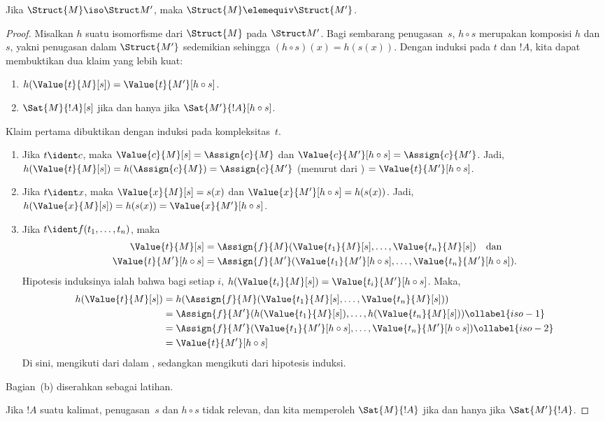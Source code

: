 \documentclass[../../../include/open-logic-section]{subfiles}
\begin{document}
\begin{thm}
Jika $\Struct{M} \iso \Struct M'$, maka $\Struct{M} \elemequiv
\Struct{M'}$.
\end{thm}

\begin{proof}
Misalkan $h$ suatu isomorfisme dari $\Struct{M}$ pada $\Struct M'$. Bagi
sembarang penugasan~$s$, $h \circ s$ merupakan komposisi $h$ dan $s$, yakni
penugasan dalam $\Struct{M'}$ sedemikian sehingga $(h \circ s)(x) = h(s(x))$.
Dengan induksi pada $t$ dan $!A$, kita dapat membuktikan dua klaim yang lebih
kuat:
\begin{enumerate}
  \item[a.] $h(\Value{t}{M}[s]) = \Value{t}{M'}[h\circ s]$.
  \item[b.] $\Sat{M}{!A}[s]$ jika dan hanya jika
    $\Sat{M'}{!A}[h \circ s]$.
\end{enumerate}
Klaim pertama dibuktikan dengan induksi pada kompleksitas~$t$.
\begin{enumerate}
\item Jika $t \ident c$, maka $\Value{c}{M}[s] = \Assign{c}{M}$ dan
  $\Value{c}{M'}[h \circ s] = \Assign{c}{M'}$. Jadi,
  $h(\Value{t}{M}[s]) = h(\Assign{c}{M}) = \Assign{c}{M'}$ (menurut
   dari ) $=
  \Value{t}{M'}[h \circ s]$.
\item Jika $t \ident x$, maka $\Value{x}{M}[s] = s(x)$ dan
  $\Value{x}{M'}[h \circ s] = h(s(x))$. Jadi,
  $h(\Value{x}{M}[s]) = h(s(x)) = \Value{x}{M'}[h \circ s]$.
\item Jika $t \ident f(t_1, \dots, t_n)$, maka
  \begin{align*}
    \Value{t}{M}[s] & = \Assign{f}{M}(\Value{t_1}{M}[s], \dots,
      \Value{t_n}{M}[s]) \quad\text{dan}\\
    \Value{t}{M'}[h \circ s] & = \Assign{f}{M'}(\Value{t_1}{M'}[h \circ
      s], \dots, \Value{t_n}{M'}[h \circ s]).
  \end{align*}
  Hipotesis induksinya ialah bahwa bagi setiap $i$,
  $h(\Value{t_i}{M}[s]) = \Value{t_i}{M'}[h\circ s]$. Maka,
  \begin{align}
    h(\Value{t}{M}[s])
    & = h(\Assign{f}{M}(\Value{t_1}{M}[s], \dots,
      \Value{t_n}{M}[s])) \notag\\
    & = \Assign{f}{M'}(h(\Value{t_1}{M}[s]), \dots,
      h(\Value{t_n}{M}[s])) \ollabel{iso-1}\\
    & = \Assign{f}{M'}(\Value{t_1}{M'}[h \circ s], \dots,
      \Value{t_n}{M'}[h \circ s]) \ollabel{iso-2}\\
    & = \Value{t}{M'}[h\circ s] \notag
  \end{align}
  Di sini,  mengikuti dari  dalam
  , sedangkan  mengikuti dari hipotesis
  induksi.
\end{enumerate}
Bagian~(b) diserahkan sebagai latihan.

Jika $!A$ suatu kalimat, penugasan~$s$ dan $h \circ s$ tidak relevan, dan
kita memperoleh $\Sat{M}{!A}$ jika dan hanya jika $\Sat{M'}{!A}$.
\end{proof}
\end{document}
